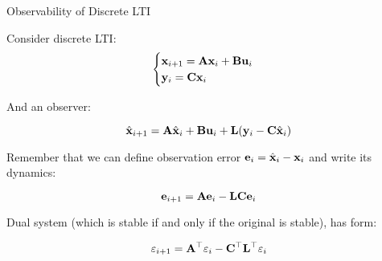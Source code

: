 \documentclass{beamer}
\begin{document}
\begin{frame}{Observability of Discrete LTI}
\begin{flushleft}

Consider discrete LTI:
\begin{equation}
\begin{cases}
\mathbf{x}_{i+1} = \mathbf{A}  \mathbf{x}_i + \mathbf{B} \mathbf{u}_i \\
\mathbf{y}_i     = \mathbf{C}  \mathbf{x}_i
\end{cases}
\end{equation}

And an observer:

\begin{equation}
\hat{\mathbf{x}}_{i+1} = \mathbf{A}  \hat{\mathbf{x}}_i + \mathbf{B} \mathbf{u}_i + 
\mathbf{L} (\mathbf{y}_i - \mathbf{C} \hat{\mathbf{x}}_i)
\end{equation}

Remember that we can define observation error $\mathbf{e}_i = \hat{\mathbf{x}}_i - \mathbf{x}_i$ and write its dynamics:

\begin{equation}
\mathbf{e}_{i+1} = \mathbf{A} \mathbf{e}_i - 
\mathbf{L} \mathbf{C} \mathbf{e}_i
\end{equation}

Dual system (which is stable if and only if the original is stable), has form:

\begin{equation}
\varepsilon_{i+1} = \mathbf{A}^\top \varepsilon_i - 
\mathbf{C}^\top \mathbf{L}^\top \varepsilon_i
\end{equation}


\end{flushleft}
\end{frame}
\end{document}
